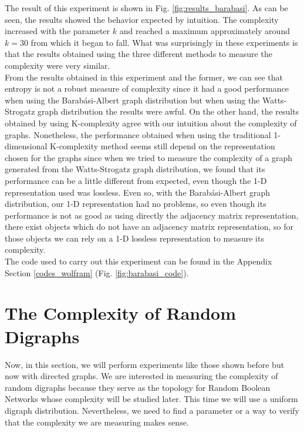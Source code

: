 The result of this experiment is shown in Fig. \ref{fig:results_barabasi}. As can be seen, the results showed the behavior expected by intuition. The complexity increased with the parameter $k$ and reached a maximum approximately around $k=30$ from which it began to fall. What was surprisingly in these experiments is that the results obtained using the three different methods to measure the complexity were very similar.\\

From the results obtained in this experiment and the former, we can see that entropy is not a robust measure of complexity since it had a good performance when using the Barabási-Albert graph distribution but when using the Watts-Strogatz graph distribution the results were awful. On the other hand, the results obtained by using K-complexity agree with our intuition about the complexity of graphs. Nonetheless, the performance obtained when using the traditional 1-dimensional K-complexity method seems still depend on the representation chosen for the graphs since when we tried to measure the complexity of a graph generated from the Watts-Strogatz graph distribution, we found that its performance can be a little different from expected, even though the 1-D representation used was lossless. Even so, with the Barabási-Albert graph distribution, our 1-D representation had no problems, so even though its performance is not as good as using directly the adjacency matrix representation, there exist objects which do not have an adjacency matrix representation, so for those objects we can rely on a 1-D lossless representation to measure its complexity.\\

The code used to carry out this experiment can be found in the Appendix Section \ref{codes_wolfram} (Fig. \ref{fig:barabasi_code}).

\section{The Complexity of Random Digraphs}
\label{complex_di_section}
Now, in this section, we will perform experiments like those shown before but now with directed graphs. We are interested in measuring the complexity of random digraphs because they serve as the topology for Random Boolean Networks whose complexity will be studied later. This time we will use a uniform digraph distribution. Nevertheless, we need to find a parameter or a way to verify that the complexity we are measuring makes sense.\\

